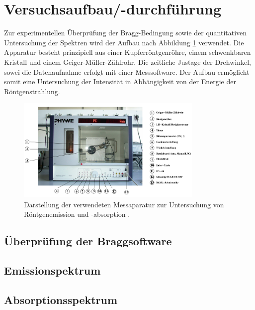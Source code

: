 \section{Versuchsaufbau/-durchführung}
Zur experimentellen Überprüfung der Bragg-Bedingung sowie der quantitativen Untersuchung der Spektren wird der Aufbau nach Abbildung
\ref{fig: aufbau} verwendet. Die Apparatur besteht prinzipiell aus einer Kupferröntgenröhre, einem schwenkbaren Kristall und einem
Geiger-Müller-Zählrohr. Die zeitliche Justage der Drehwinkel, sowei die Datenaufnahme erfolgt mit einer
Messsoftware. Der Aufbau ermöglicht somit eine Untersuchung der Intensität in Abhängigkeit von der Energie
der Röntgenstrahlung.
\begin{figure}
  \centering
  \includegraphics[width = 0.8\textwidth]{aufbau.png}
  \caption{Darstellung der verwendeten Messaparatur zur Untersuchung von Röntgenemission und -absorption \cite{}.}
  \label{fig: aufbau}
\end{figure}
\subsection{Überprüfung der Braggsoftware}

\subsection{Emissionspektrum}

\subsection{Absorptionsspektrum}
